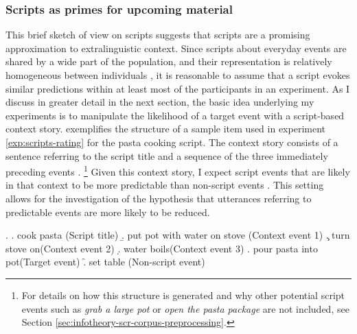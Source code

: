 \subsubsection{Scripts as primes for upcoming material}
This brief sketch of  view on scripts suggests that scripts are a promising approximation to extralinguistic context. Since scripts about everyday events are shared by a wide part of the population, and their representation is relatively homogeneous between individuals \citep{bower.etal1979}, it is reasonable to assume that a script evokes similar predictions within at least most of the participants in an experiment. As I discuss in greater detail in the next section, the basic idea underlying my experiments is to manipulate the likelihood of a target event with a script-based context story. \Next exemplifies the structure of a sample item used in experiment \ref{exp:scripts-rating} for the pasta cooking script. The context story consists of a  sentence referring to the script title \Next[a] and a sequence of the three immediately preceding events \Next[b-d].%
%
\footnote{For details on how this structure is generated and why other potential script events such as \textit{grab a large pot} or \textit{open the pasta package} are not included, see Section \ref{sec:infotheory-scr-corpus-preprocessing}.}\afterfn%
%
Given this context story, I expect script events \Next[e] that are likely in that context to be more predictable than non-script events \Next[f]. This setting allows for the investigation of the hypothesis that utterances referring to predictable events are more likely to be reduced.

\ex.  \label{ex:scripts-item-abstract}
\a. cook pasta \hfill (Script title)
    \b. put pot with water on stove \hfill (Context event 1)
    \c. turn stove on\hfill (Context event 2)
    \d. water boils\hfill (Context event 3)
    \e. pour pasta into pot\hfill (Target event)
    \f. set table \hfill (Non-script event)

